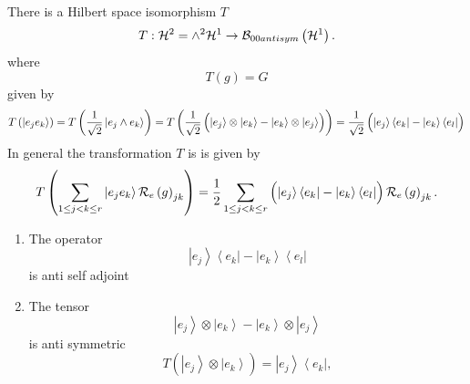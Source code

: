 \begin{theorem}
There is a Hilbert space isomorphism $T$ 
\begin{equation}
T:{\cal H}^{2}={\huge \wedge }^{2}{\cal H}^{1}\rightarrow {\cal B}%
_{00antisym}\left( {\cal H}^{1}\right) .
\end{equation}%
where 
\begin{equation}
T\left( g\right) =G
\end{equation}%
given by 
\begin{equation}
T\left( \left\vert e_{j}e_{k}\right\rangle \right) =T\left( \frac{1}{\sqrt{2}%
}\left\vert e_{j}\wedge e_{k}\right\rangle \right) =T\left( \frac{1}{\sqrt{2}%
}\left( \stackrel{}{\left\vert e_{j}\right\rangle \otimes \left\vert
e_{k}\right\rangle -\left\vert e_{k}\right\rangle \otimes \left\vert
e_{j}\right\rangle }\right) \right) =\frac{1}{\sqrt{2}}\left( \stackrel{}{%
\left\vert e_{j}\right\rangle \left\langle e_{k}\right\vert -\left\vert
e_{k}\right\rangle \left\langle e_{l}\right\vert }\right)
\end{equation}%
In general the transformation $T$ is is given by%
\begin{equation}
T\left( \sum_{1\leq j<k\leq r}\left\vert e_{j}e_{k}\right\rangle {\cal R}%
_{e}\left( g\right) _{jk}\right) =\frac{1}{2}\sum_{1\leq j<k\leq r}\left( 
\stackrel{}{\left\vert e_{j}\right\rangle \left\langle e_{k}\right\vert
-\left\vert e_{k}\right\rangle \left\langle e_{l}\right\vert }\right) {\cal R%
}_{e}\left( g\right) _{jk}.
\end{equation}

\begin{remark}
\begin{enumerate}
\item The operator 
\begin{equation}
\left\vert e_{j}\right\rangle \left\langle e_{k}\right\vert -\left\vert
e_{k}\right\rangle \left\langle e_{l}\right\vert
\end{equation}%
is anti self adjoint

\item The tensor 
\begin{equation}
\left\vert e_{j}\right\rangle \otimes \left\vert e_{k}\right\rangle
-\left\vert e_{k}\right\rangle \otimes \left\vert e_{j}\right\rangle
\end{equation}%
is anti symmetric 
\begin{equation}
T\left( \stackrel{}{\left\vert e_{j}\right\rangle \otimes \left\vert
e_{k}\right\rangle }\right) =\left\vert e_{j}\right\rangle \left\langle
e_{k}\right\vert ,
\end{equation}


\end{enumerate}
\end{remark}
\end{theorem}
